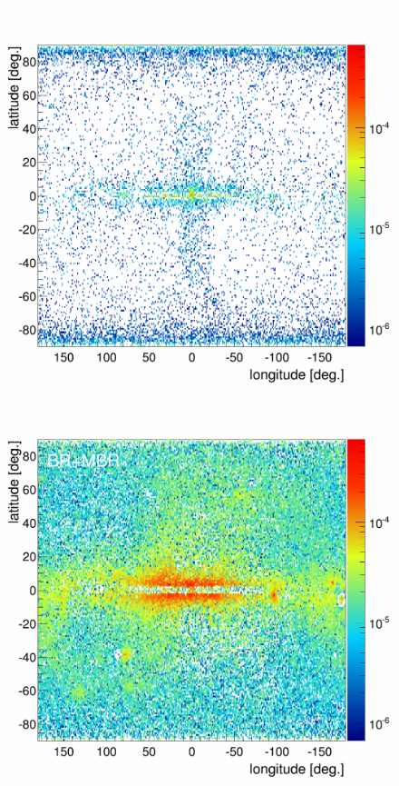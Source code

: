 \begin{figure}[b]
\begin{minipage}[h]{0.45\textwidth}
	  \subcaption{}
	  \label{}
  \end{minipage}
  \hfill
  \begin{minipage}[h]{0.45\textwidth}
	  \centering
	  \includegraphics[width=1.\linewidth]{pic/discussion/MBR_MBR_Integral.png}
	  \subcaption{}
	  \label{}
  \end{minipage}
  \hfill
  \begin{minipage}[h]{0.45\textwidth}
	  \centering
	  \includegraphics[width=1.\linewidth]{pic/discussion/MBR_BR+MBR_Integral.png}

\end{minipage}
\end{figure}
